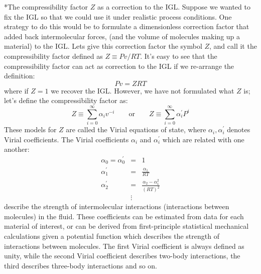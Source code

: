 \documentclass[11pt]{article}
\makeatletter
\theoremstyle{definition}
\renewcommand\paragraph{\@startsection
	{paragraph}{2}{0mm}
	{-0.05in}
	{-0.5\baselineskip}
	{\normalfont\normalsize\itshape}}
\makeatother
\begin{document}
\paragraph*{The compressibility factor $Z$ as a correction to the IGL.}
Suppose we wanted to fix the IGL so that we could use it under realistic process conditions.
One strategy to do this would be to formulate a dimensionless correction factor that added back intermolecular forces,
(and the volume of molecules making up a material) to the IGL.
Lets give this correction factor the symbol $Z$, and call it the compressibility factor defined as $Z \equiv {Pv}/{RT}$.
It's easy to see that the compressibility factor can act as correction to the IGL if we re-arrange the definition:
\begin{equation}
			Pv = ZRT
\end{equation}where if $Z=1$ we recover the IGL.
However, we have not formulated what $Z$ is; let's define the compressibility factor as:
\begin{equation}
  \displaystyle Z \equiv  \sum_{i=0}^{\infty}\alpha_{i}v^{-i}\qquad\mathrm{or}\qquad
  \displaystyle Z \equiv  \sum_{i=0}^{\infty}\alpha^{\prime}_{i}P^{i}
\end{equation}
These models for $Z$ are called the Virial equations of state, where $\alpha_{i},\alpha^{\prime}_{i}$ denotes Virial coefficients.
The Virial coefficients $\alpha_{i}$ and $\alpha^{\prime}_{i}$ which are related with one another:
\begin{eqnarray*}\nonumber
	\alpha_{0}=\alpha^{\prime}_{0} &=& 1 \\
	\alpha_{1}^{\prime} &=& \frac{\alpha_{1}}{RT}\\\nonumber
  \alpha_{2}^{\prime} &=& \frac{\alpha_{2}-\alpha_{1}^2}{\left(RT\right)^2}\\\nonumber
  & \vdots &
\end{eqnarray*}
describe the strength of intermolecular interactions (interactions between molecules) in the fluid.
These coefficients can be estimated from data for each material of interest, or can be derived
from first-principle statistical mechanical calculations given a potential function which describes the strength of interactions between molecules.
The first Virial coefficient is always defined as unity, while the second Virial coefficient describes two-body interactions,
the third describes three-body interactions and so on.


\end{document}
